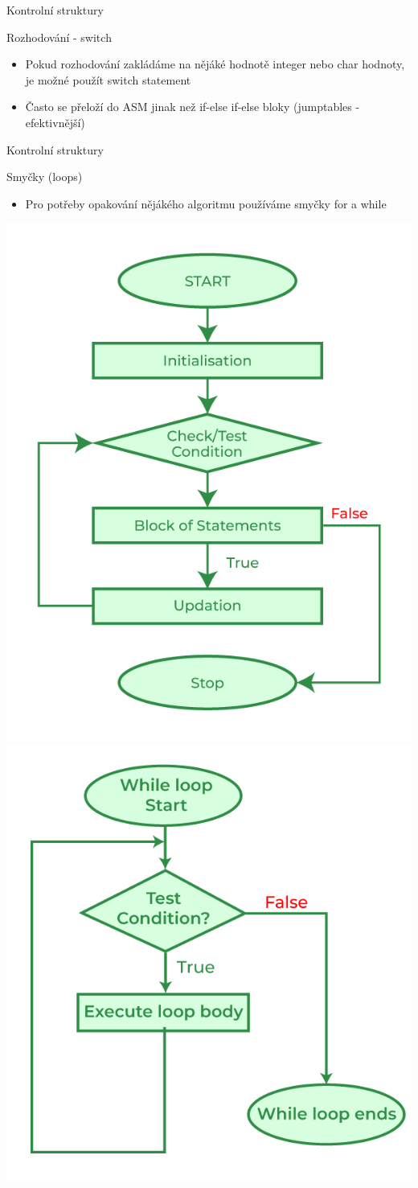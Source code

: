 \documentclass[9pt]{beamer}
\begin{document}
\begin{frame}{Kontrolní struktury}
    \begin{block}{Rozhodování - switch}
        \begin{itemize}
            \item Pokud rozhodování zakládáme na nějáké hodnotě integer nebo char hodnoty, je možné použít switch statement
            \item Často se přeloží do ASM jinak než if-else if-else bloky (jumptables - efektivnější)
        \end{itemize}
    \end{block}
    
\end{frame}

\begin{frame}{Kontrolní struktury}
    \begin{block}{Smyčky (loops)}
        \begin{itemize}
            \item Pro potřeby opakování nějákého algoritmu používáme smyčky for a while
        \end{itemize}
    \end{block}
    \begin{center}
    \includegraphics[width=0.35\linewidth]{lekce20/for_loop.png}
    \includegraphics[width=0.35\linewidth]{lekce20/while_loop.png}
\end{center}
\end{frame}
\end{document}
